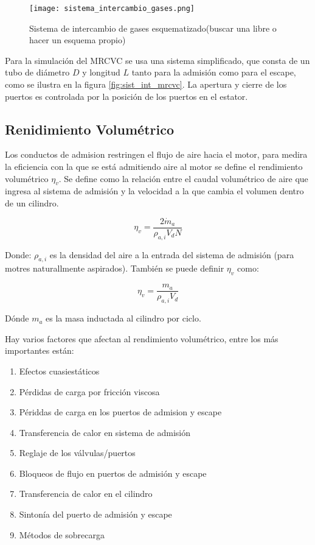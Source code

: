 \begin{figure}[h!] \centering
\texttt{[image: sistema\_intercambio\_gases.png]}
\caption{Sistema de intercambio de gases esquematizado(buscar una libre o hacer
un esquema propio)} \label{fig:sist_intercambio} \end{figure}

Para la simulación del MRCVC se usa una sistema simplificado, que consta de un
tubo de diámetro $D$ y longitud $L$ tanto para la admisión como para el escape,
como se ilustra en la figura \ref{fig:sist_int_mrcvc}.
%
La apertura y cierre de los puertos es controlada por la posición de los
puertos en el estator.

\subsection{Renidimiento Volumétrico} \label{sec:rend_vol}
%

Los conductos de admision restringen el flujo de aire hacia el motor, para
medira la eficiencia con la que se está admitiendo aire al motor se define el
rendimiento volumétrico $\eta_v$.
%
Se define como la relación entre el caudal volumétrico de aire que ingresa al
sistema de admisión y la velocidad a la que cambia el volumen dentro de un
cilindro.


$$ \eta_v = \frac{2 \dot{m}_a}{\rho_{a,i} V_d N} $$

Donde: $\rho_{a,i}$ es la densidad del aire a la entrada del sistema de
admisión (para motres naturallmente aspirados). También se puede definir
$\eta_v$ como:

$$ \eta_v = \frac{m_a}{\rho_{a,i} V_d} $$

Dónde $m_a$ es la masa inductada al cilindro por ciclo.

Hay varios factores que afectan al rendimiento volumétrico, entre los más
importantes están:
%
\begin{enumerate} \item Efectos cuasiestáticos \item Pérdidas de carga por
    fricción viscosa \item Périddas de carga en los puertos de admision y
    escape \item Transferencia de calor en sistema de admisión \item Reglaje de
    los válvulas/puertos \item Bloqueos de flujo en puertos de admisión y
    escape \item Transferencia de calor en el cilindro \item Sintonía del
    puerto de admisión y escape \item Métodos de sobrecarga \end{enumerate}

